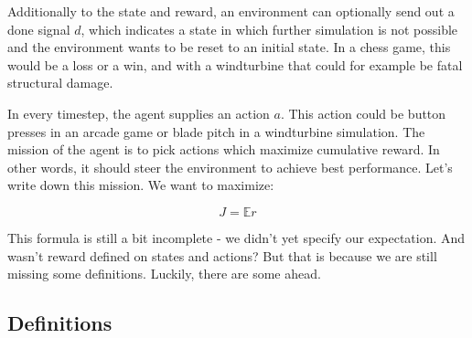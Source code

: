 \documentclass[hyperref,german,beleg]{cgvpub}
\begin{document}
Additionally to the state and reward, an environment can optionally send out a done signal \(d\), which indicates a state in which further simulation is not possible and the environment wants to be reset to an initial state. In a chess game, this would be a loss or a win, and with a windturbine that could for example be fatal structural damage. 

In every timestep, the agent supplies an action \(a\). This action could be button presses in an arcade game or blade pitch in a windturbine simulation. The mission of the agent is to pick actions which maximize cumulative reward. In other words, it should steer the environment to achieve best performance. Let's write down this mission. We want to maximize:

\begin{equation}
J = \mathbb{E}r
\end{equation}

This formula is still a bit incomplete - we didn't yet specify our expectation. And wasn't reward defined on states and actions? But that is because we are still missing some definitions. Luckily, there are some ahead.

\subsection{Definitions}
\label{sec:definitions}
\end{document}
